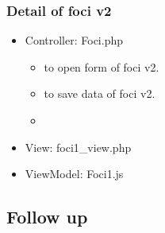 \documentclass[letterpaper,10pt,english,openany,oneside]{sphinxmanual}
\begin{document}
\subsubsection{Detail of foci v2}
\label{\detokenize{module/module:detail-of-foci-v2}}\begin{itemize}
\item {} 
\sphinxAtStartPar
Controller: Foci.php
\begin{itemize}
\item {} 
\sphinxAtStartPar
{} to open form of foci v2.

\item {} 
\sphinxAtStartPar
{} to save data of foci v2.

\end{itemize}

\begin{sphinxVerbatim}[commandchars=\\\{\}]
     
   
 
\end{sphinxVerbatim}
\begin{itemize}
\item {} 
\sphinxAtStartPar
{}

\end{itemize}

\item {} 
\sphinxAtStartPar
View: foci1\_view.php

\item {} 
\sphinxAtStartPar
ViewModel: Foci1.js

\end{itemize}


\subsection{Follow up}
\label{\detokenize{module/module:follow-up}}
\end{document}
